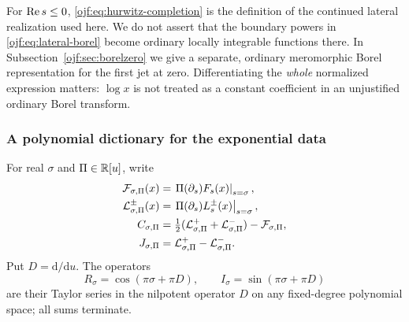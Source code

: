 \begin{remark}
For $\operatorname{Re} s\le0$, \eqref{ojf:eq:hurwitz-completion} is the definition of
the continued lateral realization used here. We do not assert that the
boundary powers in \eqref{ojf:eq:lateral-borel} become ordinary locally
integrable functions there. In Subsection~\ref{ojf:sec:borelzero} we give a
separate, ordinary meromorphic Borel representation for the first jet
at zero. Differentiating the \emph{whole} normalized expression matters:
$\log x$ is not treated as a constant coefficient in an unjustified
ordinary Borel transform.
\end{remark}

\subsubsection{A polynomial dictionary for the exponential data}
For real $\sigma$ and $\Pi\in\mathbb R[u]$, write
\begin{align}
 \mathcal{F}_{\sigma,\Pi}(x)&=
       \left.\Pi(\partial_s)F_s(x)\right|_{s=\sigma},\label{ojf:eq:observable}\\
 \mathcal{L}^\pm_{\sigma,\Pi}(x)&=
       \left.\Pi(\partial_s)L_s^\pm(x)\right|_{s=\sigma},\notag\\
 C_{\sigma,\Pi}&=\tfrac12(\mathcal{L}^+_{\sigma,\Pi}+
                           \mathcal{L}^-_{\sigma,\Pi})-\mathcal{F}_{\sigma,\Pi},\notag\\
 J_{\sigma,\Pi}&=\mathcal{L}^+_{\sigma,\Pi}-\mathcal{L}^-_{\sigma,\Pi}.\notag
\end{align}
Put $D=\mathrm d/\mathrm du$. The operators
\begin{equation}\label{ojf:eq:operators}
 R_\sigma=\cos(\pi\sigma+\pi D),\qquad
 I_\sigma=\sin(\pi\sigma+\pi D)
\end{equation}
are their Taylor series in the nilpotent operator $D$ on any fixed-degree
polynomial space; all sums terminate.

